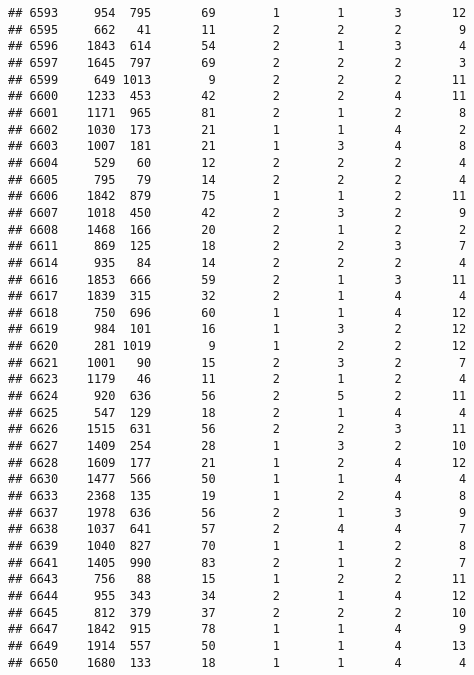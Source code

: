 \documentclass[]{article}
\begin{document}
\begin{verbatim}
## 6593     954  795       69        1        1       3       12
## 6595     662   41       11        2        2       2        9
## 6596    1843  614       54        2        1       3        4
## 6597    1645  797       69        2        2       2        3
## 6599     649 1013        9        2        2       2       11
## 6600    1233  453       42        2        2       4       11
## 6601    1171  965       81        2        1       2        8
## 6602    1030  173       21        1        1       4        2
## 6603    1007  181       21        1        3       4        8
## 6604     529   60       12        2        2       2        4
## 6605     795   79       14        2        2       2        4
## 6606    1842  879       75        1        1       2       11
## 6607    1018  450       42        2        3       2        9
## 6608    1468  166       20        2        1       2        2
## 6611     869  125       18        2        2       3        7
## 6614     935   84       14        2        2       2        4
## 6616    1853  666       59        2        1       3       11
## 6617    1839  315       32        2        1       4        4
## 6618     750  696       60        1        1       4       12
## 6619     984  101       16        1        3       2       12
## 6620     281 1019        9        1        2       2       12
## 6621    1001   90       15        2        3       2        7
## 6623    1179   46       11        2        1       2        4
## 6624     920  636       56        2        5       2       11
## 6625     547  129       18        2        1       4        4
## 6626    1515  631       56        2        2       3       11
## 6627    1409  254       28        1        3       2       10
## 6628    1609  177       21        1        2       4       12
## 6630    1477  566       50        1        1       4        4
## 6633    2368  135       19        1        2       4        8
## 6637    1978  636       56        2        1       3        9
## 6638    1037  641       57        2        4       4        7
## 6639    1040  827       70        1        1       2        8
## 6641    1405  990       83        2        1       2        7
## 6643     756   88       15        1        2       2       11
## 6644     955  343       34        2        1       4       12
## 6645     812  379       37        2        2       2       10
## 6647    1842  915       78        1        1       4        9
## 6649    1914  557       50        1        1       4       13
## 6650    1680  133       18        1        1       4        4

\end{verbatim}
\end{document}
